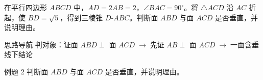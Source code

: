 \documentclass{exam-zh}
\begin{document}
\begin{eduProblemBlock}[例题 2（面面垂直判定）]
\noindent
\begin{minipage}[t]{\dimexpr\linewidth-70mm-6mm\relax}
\vspace{0pt}
在平行四边形 $ABCD$ 中，$AD=2AB=2$，$\angle BAC=90^{\circ}$。将 $\triangle ACD$ 沿 $AC$ 折起，使 $BD=\sqrt{5}$，得到三棱锥 $D\text{-}ABC$。判断面 $ABD$ 与面 $ACD$ 是否垂直，并说明理由。

\end{minipage}\hfill
\begin{diagramcoltikz}{70mm}{折起后的三棱锥 D-ABC，观察 AB 与面 ACD 内两条相交线。}
}
\end{diagramcoltikz}
\end{eduProblemBlock}





\begin{eduAuxItem}{思路导航}
判对象：证面 $ABD\perp$ 面 $ACD$$\;\to\;$先证 $AB\perp$ 面 $ACD$$\;\to\;$一面含垂线下结论\end{eduAuxItem}




\begin{eduSubQuestionItem}{例题 2}
判断面 $ABD$ 与面 $ACD$ 是否垂直，并说明理由。\end{eduSubQuestionItem}
\end{document}
